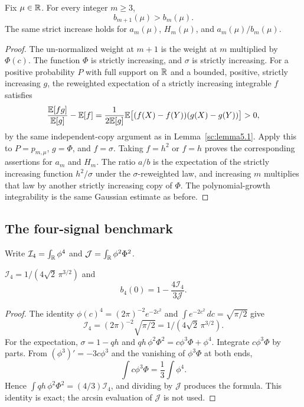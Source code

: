 \begin{lemma}\label{sc:lemma5.3}
Fix \(\mu\in\mathbb R\). For every integer \(m\ge 3\),
\[
b_{m+1}(\mu)>b_m(\mu).
\]
The same strict increase holds for \(a_m(\mu)\), \(H_m(\mu)\), and \(a_m(\mu)/b_m(\mu)\).

\end{lemma}
\begin{proof}
The un-normalized weight at \(m+1\) is the weight at \(m\) multiplied by \(\Phi(c)\). The function \(\Phi\) is strictly increasing, and \(\sigma\) is strictly increasing. For a positive probability \(P\) with full support on \(\mathbb R\) and a bounded, positive, strictly increasing \(g\), the reweighted expectation of a strictly increasing integrable \(f\) satisfies
\[
\frac{\mathbb E[fg]}{\mathbb E[g]}-\mathbb E[f]=\frac{1}{2\mathbb E[g]}\mathbb E\bigl[(f(X)-f(Y))(g(X)-g(Y))\bigr]>0,
\]
by the same independent-copy argument as in Lemma~\ref{sc:lemma5.1}. Apply this to \(P=p_{m,\mu}\), \(g=\Phi\), and \(f=\sigma\). Taking \(f=h^2\) or \(f=h\) proves the corresponding assertions for \(a_m\) and \(H_m\). The ratio \(a/b\) is the expectation of the strictly increasing function \(h^2/\sigma\) under the \(\sigma\)-reweighted law, and increasing \(m\) multiplies that law by another strictly increasing copy of \(\Phi\). The polynomial-growth integrability is the same Gaussian estimate as before.

\end{proof}

\subsection{The four-signal benchmark}\label{sc:sub6}

Write \(\mathcal I_4=\int_{\mathbb R}\phi^4\) and \(\mathcal J=\int_{\mathbb R}\phi^2\Phi^2\).

\begin{lemma}\label{sc:lemma6.1}
\(\mathcal I_4=1/(4\sqrt 2\,\pi^{3/2})\) and
\[
b_4(0)=1-\frac{4\mathcal I_4}{3\mathcal J}.
\]

\end{lemma}
\begin{proof}
The identity \(\phi(c)^4=(2\pi)^{-2}e^{-2c^2}\) and \(\int e^{-2c^2}\,dc=\sqrt{\pi/2}\) give
\[
\mathcal I_4=(2\pi)^{-2}\sqrt{\pi/2}=1/(4\sqrt 2\,\pi^{3/2}).
\]
For the expectation, \(\sigma=1-qh\) and \(qh\,\phi^2\Phi^2=c\phi^3\Phi+\phi^4\). Integrate \(c\phi^3\Phi\) by parts. From \((\phi^3)'=-3c\phi^3\) and the vanishing of \(\phi^3\Phi\) at both ends,
\[
\int c\phi^3\Phi=\frac13\int\phi^4.
\]
Hence \(\int qh\,\phi^2\Phi^2=(4/3)\mathcal I_4\), and dividing by \(\mathcal J\) produces the formula. This identity is exact; the arcsin evaluation of \(\mathcal J\) is not used.

\end{proof}

